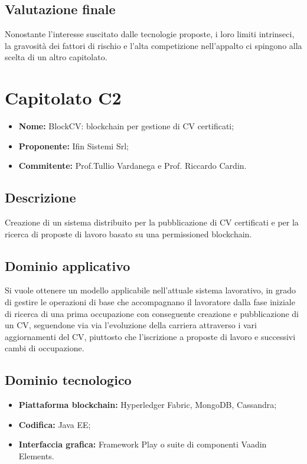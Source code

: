 \documentclass[openany,12pt,a4paper]{report}
\begin{document}
\subsection{Valutazione finale}

Nonostante l'interesse suscitato dalle tecnologie proposte, i loro limiti intrinseci, la gravosità dei fattori di rischio e l'alta competizione nell'appalto ci spingono alla scelta di un altro capitolato.


\section{Capitolato C2}

\begin{itemize}
    \item \textbf{Nome:} BlockCV: blockchain per gestione di CV certificati;
    \item \textbf{Proponente:} Ifin Sistemi Srl;
    \item \textbf{Commitente:} Prof.Tullio Vardanega e Prof. Riccardo Cardin.
\end{itemize}

\subsection{Descrizione}

Creazione di un sistema distribuito per la pubblicazione di CV certificati e per la ricerca di proposte di lavoro basato su una permissioned blockchain.

\subsection{Dominio applicativo}

Si vuole ottenere un modello applicabile nell'attuale sistema lavorativo, in grado di gestire le operazioni di base che accompagnano il lavoratore dalla fase iniziale di ricerca di una prima occupazione con conseguente creazione e pubblicazione di un CV, seguendone via via l’evoluzione della carriera attraverso i vari aggiornamenti del CV, piuttosto che l’iscrizione a proposte di lavoro e successivi cambi di occupazione.

\subsection{Dominio tecnologico}

\begin{itemize}
    \item \textbf{Piattaforma blockchain:} Hyperledger Fabric, MongoDB, Cassandra;
    
    \item \textbf{Codifica:} Java EE;
    
    \item \textbf{Interfaccia grafica:} Framework Play o suite di componenti Vaadin Elements.
\end{itemize}
\end{document}
